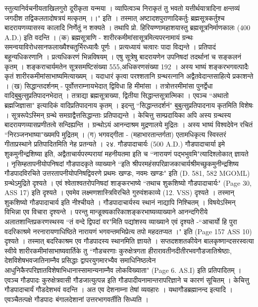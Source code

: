 स्तुत्यानिर्वचनीयताखिलगुरो दूरीकृता यन्मया ।
व्यापित्वञ्च निराकृतं तु भवतो यत्तीर्थयात्रादिना
क्षन्तव्यं जगदीश तद्विकलतादोषत्रयं मत्कृतम् ।।" इति ।
तस्मात् अष्टादशपुराणादिकर्तुः ब्रह्मसूत्रकर्तुश्च बादरायणव्यासस्य कालादि निर्णेतुं न शक्यते । तथापि प्रो. हिरियण्णामहाशयास्तु ब्रह्मसूत्रनिर्माणकालः (400 A.D.) इति वदन्ति ।
(क) ब्रह्मसूत्राणि - शारीरकमीमांसासूत्रमित्यपरनामायं ग्रन्थः समन्वयाविरोधसानफलाख्यैश्चतुर्भिरध्यायैः पूर्णः । प्रत्यध्यायं चत्वारः पादा विद्यन्ते । प्रतिपादं बहून्यधिकरणानि । प्रत्यधिकरणं भिन्नविषयम् । एषु सूत्रेषु बादरायणेन उपनिषदां तदर्थानां च सङ्कलनं कृतम् । शङ्कराचार्यमतेन सूत्रसमष्टिसंख्या 555,अधिकरणसंख्या 192 । अस्य भाष्यं शङ्करभगवत्पादैः कृतं शारीरकमीमांसाभाष्यमित्याख्यम् । यदाधारं कृत्वा परश्शतानि ग्रन्थरत्नानि अद्वैतवेदान्तसाहित्ये प्रकाशन्ते ।
(ख) सिद्धान्तदर्शनम् - पूर्वोत्तराम्नायभेदात् द्विविधा हि मीमांसा । तत्रोत्तरमीमांसा पुनर्द्वेधा वादिबुबुत्सुप्रतिपादनभेदात् । तत्राद्या ब्रह्मसूत्राख्या, द्वितीया सिद्धान्तसूत्रात्मिका । एवञ्च ``अथातो ब्रह्मजिज्ञासा" इत्यादिकं वादिप्रतिपादनाय कृतम् । इदन्तु ``सिद्धान्तदर्शनं" बुबुत्सुप्रतिपादनाय कृतमिति विशेषः । सूत्ररूपेऽस्मिन् ग्रन्थे समग्राद्वैत्तसिद्धान्ताः प्रतिपाद्यन्ते । केचित्तु साम्प्रदायिका अपि अस्य ग्रन्थस्य बादरायणव्यासप्रणीतत्वे सन्दिह्यन्ति । ग्रन्थोऽयं आनन्दाश्रम मुद्रणालये मुद्रितः । अस्य भाष्यं विश्वदेवेन रचितं ``निरञ्जनभाष्या"ख्यमपि मुद्रितम् ।
(ग) भगवद्गीता - (महाभारतान्तर्गता) एतामधिकृत्य स्विस्तरं गीताप्रस्थाने प्रतिपादितमिति नेह प्रतन्यते ।
२४. गौडपादाचार्यः (500 A.D.)
गौडपादाचार्या इमे शुकमुनीन्द्रशिष्या इति, अद्वैताचार्यपरम्परायां महनीयतमा इति च ``नारायणं पद्भभुवमि"त्यादिश्लोकात् ज्ञायते । नृसिम्हतापनीयोपनिषदां गौडपादकृते व्याख्याने ``इति श्रीपरमहंसपरिव्राजकाचार्यश्रीमच्छुकमुनीन्द्रशिष्य गौडपादविरचिते उत्तरतापनीयोपनिषद्विवरणे प्रथमः खण्डः, नवमः खण्डः" इति (D. 581, 582 MGOML) ग्रन्थेऽमुद्रिते दृश्यते । एवं श्वेताश्वतरोपनिषदां शाङ्करभाष्ये ``तथाच शुकशिष्यो गौडपादाचार्यः" (Page 30, ASS 17) इति दृश्यते । एवमेव लक्ष्मणशास्त्रिविरचिते गुरुवंशकाव्ये (12. VSS) दृश्यते । तस्मान् शुकशिष्यो गौडपादाचार्य इति नीश्चीयते ।
गौडपादाचार्यस्य स्थानं नाद्यापि निश्चितम् । विषयेऽस्मिन् विभिन्ना एव विचारा दृश्यन्ते । परन्तु मान्डूक्यकारिकाशङ्करभाष्यव्याख्याने आनन्दगिरीये अलातशान्तिप्रकरणस्थस्य ``तं वन्दे द्विपदां वर"मिति पद्यांशस्य व्याख्याने एवं दृश्यते -``आचार्यो हि पुरा वदरिकाश्रमे नरनारायणाधिष्ठिते नारायणं भगवन्तमभिप्रेत्य तपो महदतप्यत ।" इति (Page 157 ASS 10) दृश्यते । तस्मात् बदरिकाश्रम एव गौडपादस्य स्थानमिति ज्ञायते । सप्तदशशतकीयेन बालकृष्णान्दसरस्वत्या स्वीये शारीरकमीमांसाभाष्यवार्तिके तु ``गौडचरणाः कुरुक्षेत्रगता हीरारावतीनदीतीरभवगौडजातिश्रेष्ठाः, देशविशेषभवजातिनाम्नैव प्रसिद्धाः द्वापरयुगमारभ्यैव समाधिनिष्ठत्वेन आधुनिकैरपरिज्ञातविशेषाभिधानास्सामान्यनाम्नैव लोकविख्याता" (Page 6. AS.I) इति प्रतिपादितम् । एवञ्च गौडपादः कुरुक्षेत्रवासी गौडजात्युत्पन्न इति गौडपादीयनामान्तरापरिज्ञाने च कारणं सूचितम् । केचित्तु गौडपादाचार्यं गौडदेशभवं वदन्ति । अत एव देशनाम्ना तेषां व्यवहारः । यथागौडब्रह्मानन्द इत्यादि । एवञ्चैतत्पक्षे गौडपादः बंगालदेशानां उत्तरभागवर्तीति सिध्यति ।

